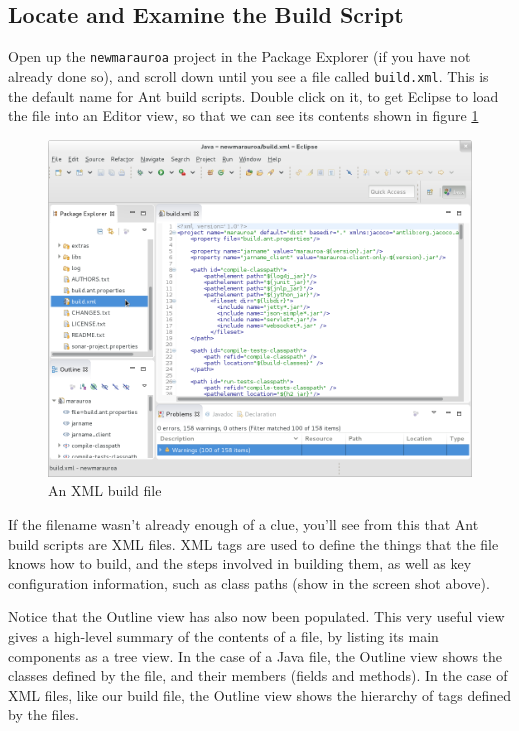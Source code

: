 \documentclass[
]{book}
\begin{document}
\hypertarget{locate-and-examine-the-build-script}{%
\subsection{Locate and Examine the Build Script}\label{locate-and-examine-the-build-script}}

Open up the \texttt{newmarauroa} project in the Package Explorer (if you have not already done so), and scroll down until you see a file called \texttt{build.xml}. This is the default name for Ant build scripts. Double click on it, to get Eclipse to load the file into an Editor view, so that we can see its contents shown in figure \ref{fig:buildfile-fig}

\begin{figure}

{\centering \includegraphics[width=1\linewidth]{images/2.1buildFile} 

}

\caption{An XML build file}\label{fig:buildfile-fig}
\end{figure}

If the filename wasn't already enough of a clue, you'll see from this that Ant build scripts are XML files. XML tags are used to define the things that the file knows how to build, and the steps involved in building them, as well as key configuration information, such as class paths (show in the screen shot above).

Notice that the Outline view has also now been populated. This very useful view gives a high-level summary of the contents of a file, by listing its main components as a tree view. In the case of a Java file, the Outline view shows the classes defined by the file, and their members (fields and methods). In the case of XML files, like our build file, the Outline view shows the hierarchy of tags defined by the files.
\end{document}

